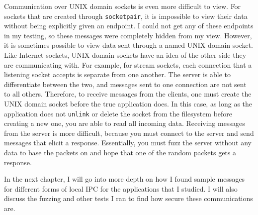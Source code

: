 Communication over UNIX domain sockets is even more difficult to view.  For sockets that are created through \texttt{socketpair}, it is impossible to view their data without being explicitly given an endpoint.  I could not get any of these endpoints in my testing, so these messages were completely hidden from my view.  However, it is sometimes possible to view data sent through a named UNIX domain socket.  Like Internet sockets, UNIX domain sockets have an idea of the other side they are communicating with.  For example, for stream sockets, each connection that a listening socket accepts is separate from one another.  The server is able to differentiate between the two, and messages sent to one connection are not sent to all others.  Therefore, to receive messages from the clients, one must create the UNIX domain socket before the true application does.  In this case, as long as the application does not \texttt{unlink} or delete the socket from the filesystem before creating a new one, you are able to read all incoming data.  Receiving messages from the server is more difficult, because you must connect to the server and send messages that elicit a response.  Essentially, you must fuzz the server without any data to base the packets on and hope that one of the random packets gets a response.

In the next chapter, I will go into more depth on how I found sample messages for different forms of local IPC for the applications that I studied.  I will also discuss the fuzzing and other tests I ran to find how secure these communications are.
